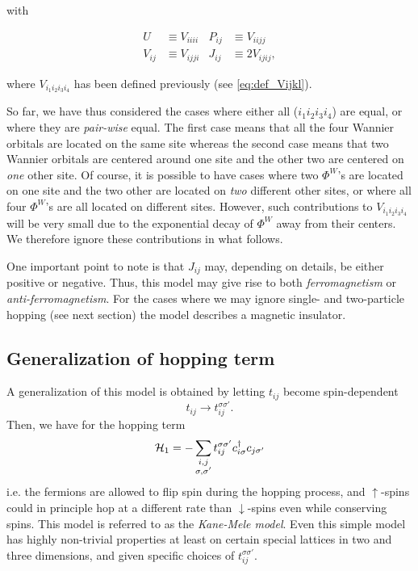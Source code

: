 with
\begin{tcolorbox}
	\begin{align*}
		U&\equiv V_{iiii} &
		P_{ij} &\equiv V_{iijj} \\
		V_{ij} & \equiv V_{ijji} &
		J_{ij} &\equiv 2V_{ijij},
	\end{align*}
\end{tcolorbox}
 where $V_{i_1i_2i_3i_4}$ has been defined previously (see \cref{eq:def_Vijkl}).

So far, we have thus considered the cases where either all ($i_1i_2i_3i_4$) are equal, or where they are \emph{pair-wise} equal. The first case means that all the four Wannier orbitals are located on the same site whereas the second case means that two Wannier orbitals are centered around one site and the other two are centered on \emph{one} other site.
Of course, it is possible to have cases where two $\Phi^{W}$'s are located on one site and the two other are located on \emph{two} different other sites, or where all four $\Phi^{W}$'s are all located on different sites. 
However, such contributions to \emph{$V_{i_1i_2i_3i_4}$}  will be very small due to the exponential decay of $\Phi^{W}$ away from their centers. 
We therefore ignore these contributions in what follows.

One important point to note is that $J_{ij}$ may, depending on details, be either positive or negative. Thus, this model may give rise to both \emph{ferromagnetism} or \emph{anti-ferromagnetism}. For the cases where we may ignore single- and two-particle hopping (see next section) the model describes a magnetic insulator.

\subsection{Generalization of hopping term}

A generalization of this model is obtained by letting $t_{ij}$ become spin-dependent
\begin{equation}
	t_{ij}\rightarrow t_{ij}^{\sigma\sigma'}.
\end{equation}
Then, we have for the hopping term
\begin{equation}
	\Ha_{1} = -\sum_{\mathclap{\substack{i,j \\ \sigma,\sigma'}}}t_{ij}^{\sigma\sigma'}\cd_{i\sigma}c_{j\sigma'}
\end{equation}
i.e. the fermions are allowed to flip spin during the hopping process, and $\uparrow$-spins could in principle hop at a different rate than $\downarrow$-spins even while conserving spins.
This model is referred to as the \emph{Kane-Mele model}. Even this simple model has highly non-trivial properties at least on certain special lattices in two and three dimensions, and given specific choices of $t_{ij}^{\sigma\sigma'}$.

